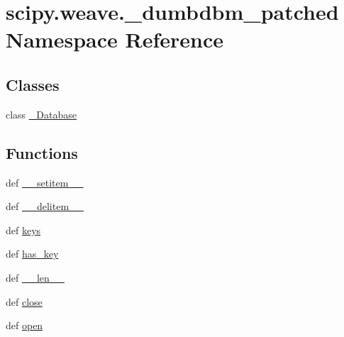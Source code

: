 \hypertarget{namespacescipy_1_1weave_1_1__dumbdbm__patched}{}\section{scipy.\+weave.\+\_\+dumbdbm\+\_\+patched Namespace Reference}
\label{namespacescipy_1_1weave_1_1__dumbdbm__patched}
\subsection*{Classes}
\begin{DoxyCompactItemize}
\item 
class \hyperlink{classscipy_1_1weave_1_1__dumbdbm__patched_1_1__Database}{\+\_\+\+Database}
\end{DoxyCompactItemize}
\subsection*{Functions}
\begin{DoxyCompactItemize}
\item 
def \hyperlink{namespacescipy_1_1weave_1_1__dumbdbm__patched_a0e8bab17ca90535ea6bcb38aae447320}{\+\_\+\+\_\+setitem\+\_\+\+\_\+}
\item 
def \hyperlink{namespacescipy_1_1weave_1_1__dumbdbm__patched_ab69582cafca5187f4298efeac2d7e91d}{\+\_\+\+\_\+delitem\+\_\+\+\_\+}
\item 
def \hyperlink{namespacescipy_1_1weave_1_1__dumbdbm__patched_ae6c6f05a13bdf01b2c145ded02fd51ba}{keys}
\item 
def \hyperlink{namespacescipy_1_1weave_1_1__dumbdbm__patched_a8b8f9db37b3291d43acbed1b80a97ecd}{has\+\_\+key}
\item 
def \hyperlink{namespacescipy_1_1weave_1_1__dumbdbm__patched_a63d58fff56e73e33f9c9f66dda821e35}{\+\_\+\+\_\+len\+\_\+\+\_\+}
\item 
def \hyperlink{namespacescipy_1_1weave_1_1__dumbdbm__patched_a190c03adba6ce913ac9f037dba9f3526}{close}
\item 
def \hyperlink{namespacescipy_1_1weave_1_1__dumbdbm__patched_a4a68f857cb83db2beead1a2973f70136}{open}
\end{DoxyCompactItemize}
